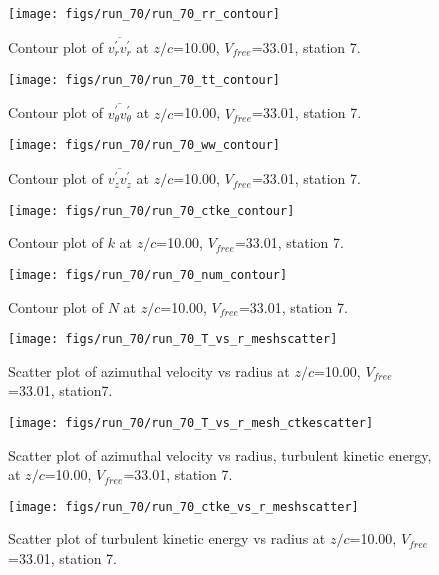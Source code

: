 \begin{figure}[H]
\centering
\texttt{[image: figs/run\_70/run\_70\_rr\_contour]}
\caption{Contour plot of $\overline{v_{r}^{\prime} v_{r}^{\prime}}$ at $z/c$=10.00, $V_{free}$=33.01, station 7.}
\end{figure}


\begin{figure}[H]
\centering
\texttt{[image: figs/run\_70/run\_70\_tt\_contour]}
\caption{Contour plot of $\overline{v_{\theta}^{\prime} v_{\theta}^{\prime}}$ at $z/c$=10.00, $V_{free}$=33.01, station 7.}
\end{figure}


\begin{figure}[H]
\centering
\texttt{[image: figs/run\_70/run\_70\_ww\_contour]}
\caption{Contour plot of $\overline{v_{z}^{\prime} v_{z}^{\prime}}$ at $z/c$=10.00, $V_{free}$=33.01, station 7.}
\end{figure}


\begin{figure}[H]
\centering
\texttt{[image: figs/run\_70/run\_70\_ctke\_contour]}
\caption{Contour plot of $k$ at $z/c$=10.00, $V_{free}$=33.01, station 7.}
\end{figure}


\begin{figure}[H]
\centering
\texttt{[image: figs/run\_70/run\_70\_num\_contour]}
\caption{Contour plot of $N$ at $z/c$=10.00, $V_{free}$=33.01, station 7.}
\end{figure}


\begin{figure}[H]
\centering
\texttt{[image: figs/run\_70/run\_70\_T\_vs\_r\_meshscatter]}
\caption{Scatter plot of azimuthal velocity vs radius at $z/c$=10.00, $V_{free}$=33.01, station7.}
\end{figure}


\begin{figure}[H]
\centering
\texttt{[image: figs/run\_70/run\_70\_T\_vs\_r\_mesh\_ctkescatter]}
\caption{Scatter plot of azimuthal velocity vs radius, turbulent kinetic energy, at $z/c$=10.00, $V_{free}$=33.01, station 7.}
\end{figure}


\begin{figure}[H]
\centering
\texttt{[image: figs/run\_70/run\_70\_ctke\_vs\_r\_meshscatter]}
\caption{Scatter plot of turbulent kinetic energy vs radius at $z/c$=10.00, $V_{free}$=33.01, station 7.}
\end{figure}


